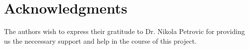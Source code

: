 \section{Acknowledgments}
The authors wish to express their gratitude to Dr. Nikola Petrovic
for providing us the neccessary support and help in the course of this project.
